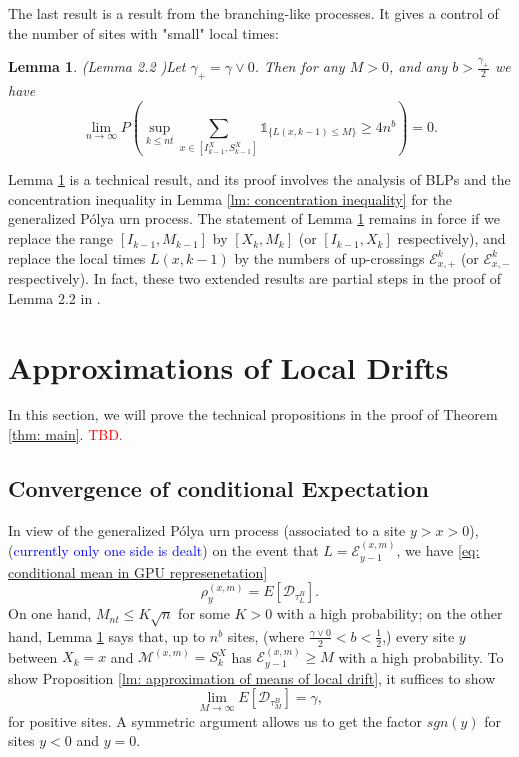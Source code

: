 \documentclass[twoside,12pt,a4paper]{article}
\newtheorem{lemma}{Lemma}[section]
\numberwithin{equation}{section}
\newcommand\TBD{\textcolor{red}{TBD.}}
\newcommand{\comment}[1]{\textcolor{blue}{#1}}
\begin{document}
		
		The last result is a result from the branching-like processes. It gives a control of the number of sites with "small" local times:
		\begin{lemma}(Lemma 2.2 \cite{KMP22})\label{lm: number of rarely visit sites}
			Let $\gamma_+ = \gamma \vee 0$. Then for any $M>0$, and any $b>\frac{\gamma_+}{2}$ we have
			$$
			\lim_{n\to\infty} P\left(\sup_{k\leq nt}  \sum_{x\in [I^X_{k-1}, S^X_{k-1}]} \mathbb{1}_{\{ L(x,k-1) \leq M \}} \geq 4n^b \right) = 0.
			$$
			
		\end{lemma}	
		Lemma \ref{lm: number of rarely visit sites} is a technical result, and its proof involves the analysis of BLPs and the concentration inequality in Lemma \ref{lm: concentration inequality} for the generalized P\'{o}lya urn process. The statement of Lemma \ref{lm: number of rarely visit sites} remains in force if we replace the range $[I_{k-1}, M_{k-1}]$ by $[X_k,M_k]$ (or $[I_{k-1},X_k]$ respectively), and replace the local times $L(x,k-1)$ by the numbers of up-crossings $\mathcal{E}^{k}_{x,+}$ (or $\mathcal{E}^{k}_{x,-}$ respectively). In fact, these two extended results are partial steps in the proof of Lemma 2.2 in \cite{KMP22}.   
		
		
		\section{Approximations of Local Drifts}\label{sec: approximations}
		In this section, we will prove the technical propositions in the proof of Theorem \ref{thm: main}. \TBD
		
		
		\subsection{Convergence of conditional Expectation}
		In view of the generalized P\'{o}lya urn process (associated to a site $y> x > 0$), (\comment{currently only one side is dealt}) on the event that $ L = \mathcal{E}^{(x,m)}_{y-1}$, we have \eqref{eq: conditional mean in GPU represenetation} 
		$$\rho^{(x,m)}_y = E[\mathcal{D}_{\tau_L^B}].$$ 
		On one hand, $M_{nt} \leq K\sqrt{n} $ for some $K>0$ with a high probability; on the other hand, Lemma \ref{lm: number of rarely visit sites} says that, up to $n^b$ sites, (where $\frac{\gamma \vee 0}{2}<b<\frac{1}{2}$,) every site $y$ between $X_k=x$ and $\mathcal{M}^{(x,m)} =S_{k}^X$ has $ \mathcal{E}^{(x,m)}_{y-1} \geq M  $ with a high probability. To show Proposition \ref{lm: approximation of means of local drift}, it suffices to show 
		\begin{equation}\label{eq: convergence of conditional expectation}
			\lim_{M\to\infty} E[\mathcal{D}_{\tau_M^B}] = \gamma , 
		\end{equation} for positive sites. A symmetric argument allows us to get the factor $sgn(y)$ for sites $y<0$ and $y=0$.
		
\end{document}
